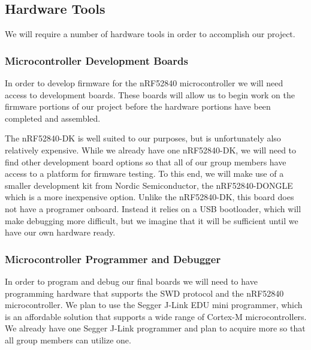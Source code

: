 




\subsection{Hardware Tools}

We will require a number of hardware tools in order to accomplish our project.

\subsubsection{Microcontroller Development Boards}

In order to develop firmware for the nRF52840 microcontroller we will need
access to development boards.  These boards will allow us to begin work on the
firmware portions of our project before the hardware portions have been
completed and assembled.

The nRF52840-DK is well suited to our purposes, but is unfortunately also
relatively expensive.  While we already have one nRF52840-DK, we will need to
find other development board options so that all of our group members have
access to a platform for firmware testing.  To this end, we will make use of a
smaller development kit from Nordic Semiconductor, the nRF52840-DONGLE which is
a more inexpensive option.  Unlike the nRF52840-DK, this board does not have a
programer onboard. Instead it relies on a USB bootloader, which will make
debugging more difficult, but we imagine that it will be sufficient until we
have our own hardware ready.

\subsubsection{Microcontroller Programmer and Debugger}

In order to program and debug our final boards we will need to have programming
hardware that supports the SWD protocol and the nRF52840 microcontroller.  We
plan to use the Segger J-Link EDU mini programmer, which is an affordable
solution that supports a wide range of Cortex-M microcontrollers.  We already
have one Segger J-Link programmer and plan to acquire more so that all group
members can utilize one.

